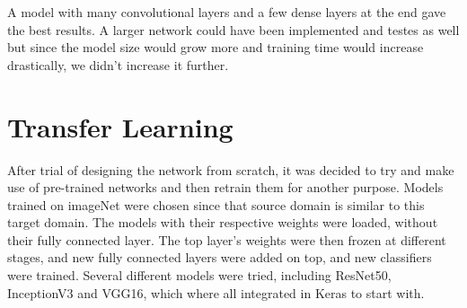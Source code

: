 A model with many convolutional layers and a few dense layers at the end gave the best
results. A larger network could have been implemented and testes as well but
since the model size would grow more and training time would increase drastically,
we didn't increase it further.

\section{Transfer Learning}
\label{sec:NNtransfer}
After trial of designing the network from scratch, it was decided to try and make use of 
pre-trained networks and then retrain them for another purpose. Models trained on 
imageNet \cite{imageNet} were chosen since that source domain is similar to this target 
domain. The models with their respective weights were loaded, without their fully 
connected layer. The top layer's weights were then frozen at different stages, and new 
fully connected layers were added on top, and new classifiers were trained. 
Several different models were tried, including ResNet50, InceptionV3 and VGG16, 
which where all integrated in Keras to start with.


